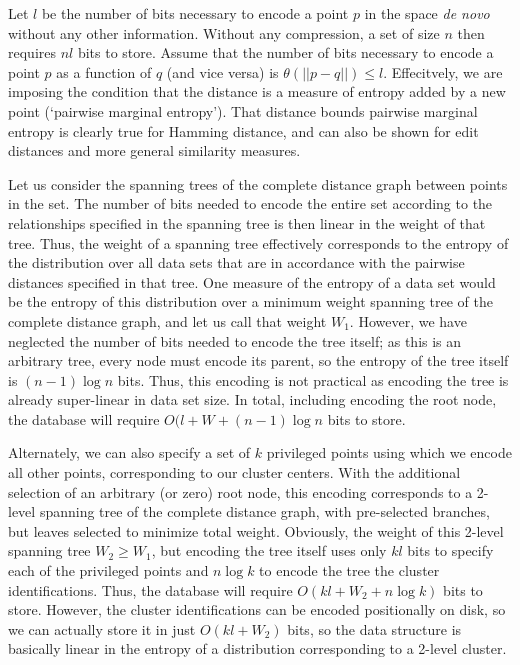 \documentclass[review,preprint,12pt]{elsarticle}
\theoremstyle{definition}
\theoremstyle{remark}
\numberwithin{equation}{section}
\begin{document}
Let $l$ be the number of bits necessary to encode a point $p$ in the space \textit{de novo} without any other information.
Without any compression, a set of size $n$ then requires $nl$ bits to store.
Assume that the number of bits necessary to encode a point $p$ as a function of $q$ (and vice versa) is $\theta(||p-q||) \le l$.
Effecitvely, we are imposing the condition that the distance is a measure of entropy added by a new point (`pairwise marginal entropy').
That distance bounds pairwise marginal entropy is clearly true for Hamming distance, and can also be shown for edit distances and more general similarity measures.

Let us consider the spanning trees of the complete distance graph between points in the set.
The number of bits needed to encode the entire set according to the relationships specified in the spanning tree is then linear in the weight of that tree.
Thus, the weight of a spanning tree effectively corresponds to the entropy of the distribution over all data sets that are in accordance with the pairwise distances specified in that tree.
One measure of the entropy of a data set would be the entropy of this distribution over a minimum weight spanning tree of the complete distance graph, and let us call that weight $W_1$.
However, we have neglected the number of bits needed to encode the tree itself; as this is an arbitrary tree, every node must encode its parent, so the entropy of the tree itself is $ (n-1) \log n$ bits.
Thus, this encoding is not practical as encoding the tree is already super-linear in data set size.
In total, including encoding the root node, the database will require $O(l + W + (n-1)\log n$ bits to store.

Alternately, we can also specify a set of $k$ privileged points using which we encode all other points, corresponding to our cluster centers.
With the additional selection of an arbitrary (or zero) root node, this encoding corresponds to a 2-level spanning tree of the complete distance graph, with pre-selected branches, but leaves selected to minimize total weight.
Obviously, the weight of this 2-level spanning tree $W_2 \ge W_1$, but
encoding the tree itself uses only $kl$ bits to specify each of the privileged points and $n \log k$ to encode the tree the cluster identifications.
Thus, the database will require $O(kl + W_2 + n \log k)$ bits to store.
However, the cluster identifications can be encoded positionally on disk, so we can actually store it in just $O(kl + W_2)$ bits, so the data structure is basically linear in the entropy of a distribution corresponding to a 2-level cluster.
\end{document}
